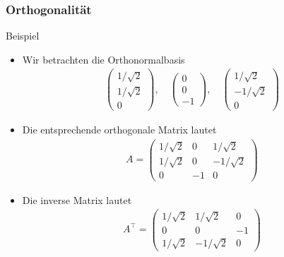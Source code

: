 \documentclass{beamer}
\newcommand{\trans}{\top}
\renewcommand{\ae}{\"a}
\newcommand{\mytitle}{Orthogonalit\ae t}
\begin{document}
\begin{frame}\frametitle{\mytitle}
	\begin{block}{Beispiel}
		\begin{itemize}
			\item Wir betrachten die Orthonormalbasis
\begin{align*}
					\begin{pmatrix}1/\sqrt 2\\1/\sqrt 2\\0\end{pmatrix},\quad\begin{pmatrix}0\\0\\-1\end{pmatrix},\quad\begin{pmatrix}1/\sqrt 2\\-1/\sqrt 2\\0\end{pmatrix}
				\end{align*}
			\item Die entsprechende orthogonale Matrix lautet
				\begin{align*}
				A=\begin{pmatrix} 1/\sqrt 2&0&1/\sqrt 2\\1/\sqrt 2&0&-1/\sqrt 2\\0&-1&0 \end{pmatrix}
				\end{align*}
			\item Die inverse Matrix lautet
				\begin{align*}
					A^\trans=\begin{pmatrix} 1/\sqrt 2&1/\sqrt 2&0\\0&0&-1\\1/\sqrt 2&-1/\sqrt 2&0 \end{pmatrix}
				\end{align*}
		\end{itemize}
	\end{block}
\end{frame}
\end{document}
